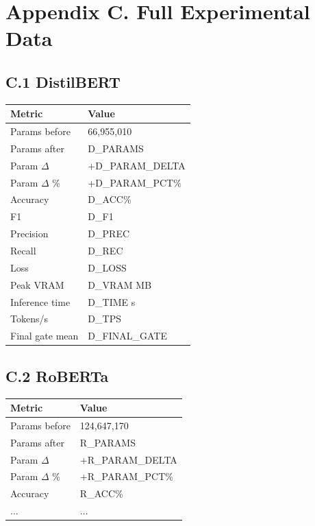 
\section{Appendix C. Full Experimental Data}

\subsection{C.1 DistilBERT}

\begin{table}[H]
\centering
\small
\begin{tabular}{ll}
\toprule
\textbf{Metric} & \textbf{Value} \\
\midrule
Params before & 66,955,010 \\
Params after & {{D\_PARAMS}} \\
Param $\Delta$ & +{{D\_PARAM\_DELTA}} \\
Param $\Delta$ \% & +{{D\_PARAM\_PCT}}\% \\
Accuracy & {{D\_ACC}}\% \\
F1 & {{D\_F1}} \\
Precision & {{D\_PREC}} \\
Recall & {{D\_REC}} \\
Loss & {{D\_LOSS}} \\
Peak VRAM & {{D\_VRAM}} MB \\
Inference time & {{D\_TIME}} s \\
Tokens/s & {{D\_TPS}} \\
Final gate mean & {{D\_FINAL\_GATE}} \\
\bottomrule
\end{tabular}
\end{table}

\subsection{C.2 RoBERTa}

\begin{table}[H]
\centering
\small
\begin{tabular}{ll}
\toprule
\textbf{Metric} & \textbf{Value} \\
\midrule
Params before & 124,647,170 \\
Params after & {{R\_PARAMS}} \\
Param $\Delta$ & +{{R\_PARAM\_DELTA}} \\
Param $\Delta$ \% & +{{R\_PARAM\_PCT}}\% \\
Accuracy & {{R\_ACC}}\% \\
... & ... \\
\bottomrule
\end{tabular}
\end{table}

